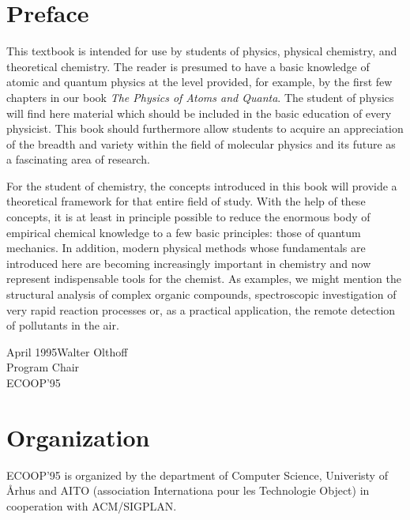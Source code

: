 \documentclass{llncs}
\begin{document}
%
\frontmatter          %
%
\pagestyle{headings}  %
%
\chapter*{Preface}
%
This textbook is intended for use by students of physics, physical
chemistry, and theoretical chemistry. The reader is presumed to have a
basic knowledge of atomic and quantum physics at the level provided, for
example, by the first few chapters in our book {\it The Physics of Atoms
and Quanta}. The student of physics will find here material which should
be included in the basic education of every physicist. This book should
furthermore allow students to acquire an appreciation of the breadth and
variety within the field of molecular physics and its future as a
fascinating area of research.

For the student of chemistry, the concepts introduced in this book will
provide a theoretical framework for that entire field of study. With the
help of these concepts, it is at least in principle possible to reduce
the enormous body of empirical chemical knowledge to a few basic
principles: those of quantum mechanics. In addition, modern physical
methods whose fundamentals are introduced here are becoming increasingly
important in chemistry and now represent indispensable tools for the
chemist. As examples, we might mention the structural analysis of
complex organic compounds, spectroscopic investigation of very rapid
reaction processes or, as a practical application, the remote detection
of pollutants in the air.

\vspace{1cm}
\begin{flushright}\noindent
April 1995\hfill Walter Olthoff\\
Program Chair\\
ECOOP'95
\end{flushright}
%
\chapter*{Organization}
ECOOP'95 is organized by the department of Computer Science, Univeristy
of \AA rhus and AITO (association Internationa pour les Technologie
Object) in cooperation with ACM/SIGPLAN.
%
\end{document}

